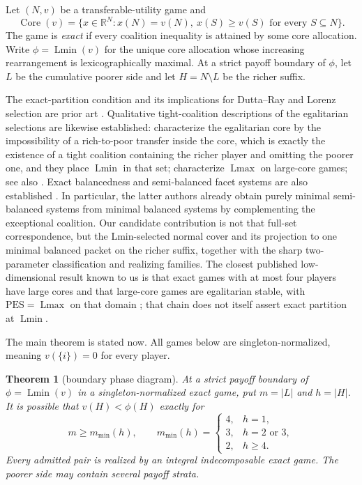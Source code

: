 \documentclass[11pt]{article}
\newtheorem{theorem}{Theorem}
\newcommand{\core}{\operatorname{Core}}
\newcommand{\Lmin}{\operatorname{Lmin}}
\newcommand{\Lmax}{\operatorname{Lmax}}
\begin{document}
Let $(N,v)$ be a transferable-utility game and
\[
 \core(v)=\{x\in\mathbb R^N:x(N)=v(N),\ x(S)\ge v(S)
                   \text{ for every }S\subseteq N\}.
\]
The game is \emph{exact} if every coalition inequality is attained by some
core allocation.  Write $\phi=\Lmin(v)$ for the unique core allocation whose
increasing rearrangement is lexicographically maximal.  At a strict payoff
boundary of $\phi$, let $L$ be the cumulative poorer side and let
$H=N\setminus L$ be the richer suffix.

The exact-partition condition and its implications for Dutta--Ray and Lorenz
selection are prior art \citep{LlerenaMauri2017,
SanchezSorianoBranzeiLlorcaTijs2010}.  Qualitative tight-coalition
descriptions of the egalitarian selections are likewise established:
\citet{ArinInarra2001} characterize the egalitarian core by the impossibility
of a rich-to-poor transfer inside the core, which is exactly the existence of
a tight coalition containing the richer player and omitting the poorer one,
and they place $\Lmin$ in that set; \citet{ArinKuipersVermeulen2003}
characterize $\Lmax$ on large-core games; see also \citet{Mauri2018}.  Exact
balancedness and semi-balanced facet systems are also established
\citep{CsokaHeringsKoczy2011,LohmannBormHerings2012,
StudenyKratochvil2022}.  In particular, the latter authors already obtain
purely minimal semi-balanced systems from minimal balanced systems by
complementing the exceptional coalition.  Our candidate contribution is not
that full-set correspondence, but the Lmin-selected normal cover and its
projection to one minimal balanced packet on the richer suffix, together with
the sharp two-parameter classification and realizing families.  The closest
published low-dimensional result known to us is that exact games with at most
four players have large cores \citep{Biswas1999} and that large-core games
are egalitarian stable, with $\mathrm{PES}=\Lmax$ on that domain
\citep{Dietzenbacher2021}; that chain does not itself assert exact partition
at $\Lmin$.

The main theorem is stated now.  All games below are
singleton-normalized, meaning $v(\{i\})=0$ for every player.

\begin{theorem}[boundary phase diagram]\label{thm:phase}
At a strict payoff boundary of $\phi=\Lmin(v)$ in a singleton-normalized
exact game, put $m=|L|$ and $h=|H|$.  It is possible that
$v(H)<\phi(H)$ exactly for
\[
 m\ge m_{\min}(h),\qquad
 m_{\min}(h)=
 \begin{cases}
 4,&h=1,\\
 3,&h=2\text{ or }3,\\
 2,&h\ge4.
 \end{cases}                                      \tag{1}
\]
Every admitted pair is realized by an integral indecomposable exact game.
The poorer side may contain several payoff strata.
\end{theorem}
\end{document}
